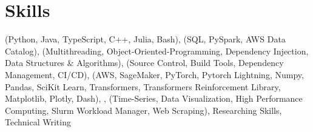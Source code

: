 \documentclass{ExpressiveResume}
\begin{document}
\section{Skills}
\noindent
{} (Python, Java, TypeScript, C++, Julia, Bash),
 (SQL, PySpark, AWS Data Catalog),
 (Multithreading, Object-Oriented-Programming, Dependency Injection, Data Structures \& Algorithms),
 (Source Control, Build Tools, Dependency Management, CI/CD),
 (AWS, SageMaker, PyTorch, Pytorch Lightning, Numpy, Pandas, SciKit Learn, Transformers, Transformers Reinforcement Library,
Matplotlib, Plotly, Dash),
,
(Time-Series, Data
Visualization, High Performance Computing, Slurm
Workload Manager, Web Scraping),
Researching Skills, Technical Writing
\end{document}
